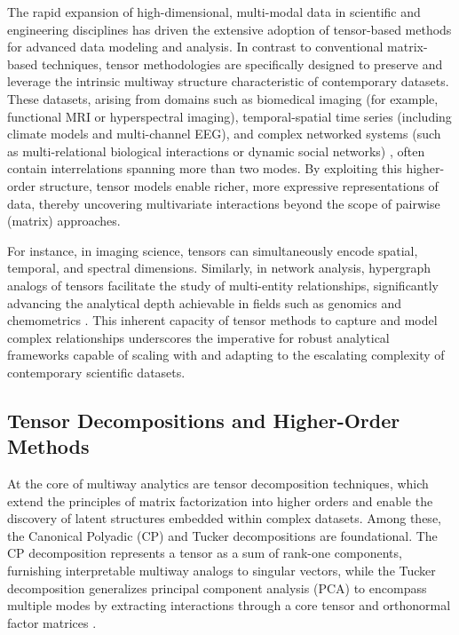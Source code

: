 \documentclass[sigconf]{acmart}
\begin{document}
The rapid expansion of high-dimensional, multi-modal data in scientific and engineering disciplines has driven the extensive adoption of tensor-based methods for advanced data modeling and analysis. In contrast to conventional matrix-based techniques, tensor methodologies are specifically designed to preserve and leverage the intrinsic multiway structure characteristic of contemporary datasets. These datasets, arising from domains such as biomedical imaging (for example, functional MRI or hyperspectral imaging), temporal-spatial time series (including climate models and multi-channel EEG), and complex networked systems (such as multi-relational biological interactions or dynamic social networks) \cite{ref104}, often contain interrelations spanning more than two modes. By exploiting this higher-order structure, tensor models enable richer, more expressive representations of data, thereby uncovering multivariate interactions beyond the scope of pairwise (matrix) approaches.

For instance, in imaging science, tensors can simultaneously encode spatial, temporal, and spectral dimensions. Similarly, in network analysis, hypergraph analogs of tensors facilitate the study of multi-entity relationships, significantly advancing the analytical depth achievable in fields such as genomics and chemometrics \cite{ref104}. This inherent capacity of tensor methods to capture and model complex relationships underscores the imperative for robust analytical frameworks capable of scaling with and adapting to the escalating complexity of contemporary scientific datasets.

\subsection{Tensor Decompositions and Higher-Order Methods}

At the core of multiway analytics are tensor decomposition techniques, which extend the principles of matrix factorization into higher orders and enable the discovery of latent structures embedded within complex datasets. Among these, the Canonical Polyadic (CP) and Tucker decompositions are foundational. The CP decomposition represents a tensor as a sum of rank-one components, furnishing interpretable multiway analogs to singular vectors, while the Tucker decomposition generalizes principal component analysis (PCA) to encompass multiple modes by extracting interactions through a core tensor and orthonormal factor matrices \cite{ref104}. 
\end{document}
